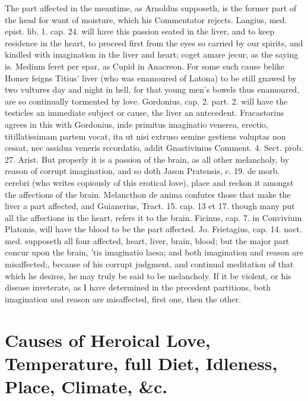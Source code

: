 {The part affected in the meantime, as Arnoldus supposeth, is the
former part of the head for want of moisture, which his Commentator
rejects. Langius, med. epist. lib. 1. cap. 24. will have this passion
seated in the liver, and to keep residence in the heart, to
proceed first from the eyes so carried by our spirits, and kindled with
imagination in the liver and heart; coget amare jecur, as the saying
is. Medium feret per epar, as Cupid in Anacreon. For some such cause
belike  Homer feigns Titius' liver (who was enamoured of Latona)
to be still gnawed by two vultures day and night in hell, for
that young men's bowels thus enamoured, are so continually tormented by
love. Gordonius, cap. 2. part. 2. will have the testicles an
immediate subject or cause, the liver an antecedent. Fracastorius
agrees in this with Gordonius, inde primitus imaginatio venerea,
erectio, \etc{} titillatissimam partem vocat, ita ut nisi extruso semine
gestiens voluptas non cessat, nec assidua veneris recordatio, addit
Gnastivinius Comment. 4. Sect. prob. 27. Arist. But properly it
is a passion of the brain, as all other melancholy, by reason of
corrupt imagination, and so doth Jason Pratensis, c. 19. de morb.
cerebri (who writes copiously of this erotical love), place and reckon
it amongst the affections of the brain. Melancthon de anima
confutes those that make the liver a part affected, and Guianerius,
Tract. 15. cap. 13 et 17. though many put all the affections in the
heart, refers it to the brain. Ficinus, cap. 7. in Convivium Platonis,
will have the blood to be the part affected. Jo. Frietagius, cap. 14.
noct. med. supposeth all four affected, heart, liver, brain, blood; but
the major part concur upon the brain, 'tis imaginatio laesa; and
both imagination and reason are misaffected;, because of his corrupt
judgment, and continual meditation of that which he desires, he may
truly be said to be melancholy. If it be violent, or his disease
inveterate, as I have determined in the precedent partitions, both
imagination and reason are misaffected, first one, then the other.


\section[Causes of Heroical Love]{Causes of Heroical Love, Temperature, full Diet, Idleness, Place, Climate, \&c.}

}
